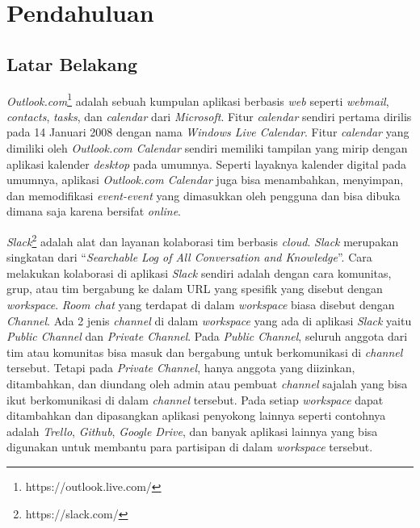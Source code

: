 \chapter{Pendahuluan}
\label{chap:intro}
   
\section{Latar Belakang}
\label{sec:label}

\textit{Outlook.com}\footnote{https://outlook.live.com/} adalah sebuah kumpulan aplikasi berbasis \textit{web} seperti \textit{webmail}, \textit{contacts}, \textit{tasks}, dan \textit{calendar} dari \textit{Microsoft}. Fitur \textit{calendar} sendiri pertama dirilis pada 14 Januari 2008 dengan nama \textit{Windows Live Calendar}. Fitur \textit{calendar} yang dimiliki oleh \textit{Outlook.com Calendar} sendiri memiliki tampilan yang mirip dengan aplikasi kalender \textit{desktop} pada umumnya. Seperti layaknya kalender digital pada umumnya, aplikasi \textit{Outlook.com Calendar} juga bisa menambahkan, menyimpan, dan memodifikasi \textit{event-event} yang dimasukkan oleh pengguna dan bisa dibuka dimana saja karena bersifat \textit{online}. 

\textit{Slack}\footnote{https://slack.com/} adalah alat dan layanan kolaborasi tim berbasis \textit{cloud}. \textit{Slack} merupakan singkatan dari ``\textit{Searchable Log of All Conversation and Knowledge}''. Cara melakukan kolaborasi di aplikasi \textit{Slack} sendiri adalah dengan cara komunitas, grup, atau tim bergabung ke dalam URL yang spesifik yang disebut dengan \textit{workspace}. \textit{Room chat} yang terdapat di dalam \textit{workspace} biasa disebut dengan \textit{Channel}. Ada 2 jenis \textit{channel} di dalam \textit{workspace} yang ada di aplikasi \textit{Slack} yaitu \textit{Public Channel} dan \textit{Private Channel}. Pada \textit{Public Channel}, seluruh anggota dari tim atau komunitas bisa masuk dan bergabung untuk berkomunikasi di \textit{channel} tersebut. Tetapi pada \textit{Private Channel}, hanya anggota yang diizinkan, ditambahkan, dan diundang oleh admin atau pembuat \textit{channel} sajalah yang bisa ikut berkomunikasi di dalam \textit{channel} tersebut. Pada setiap \textit{workspace} dapat ditambahkan dan dipasangkan aplikasi penyokong lainnya seperti contohnya adalah \textit{Trello}, \textit{Github}, \textit{Google Drive}, dan banyak aplikasi lainnya yang bisa digunakan untuk membantu para partisipan di dalam \textit{workspace} tersebut. 

